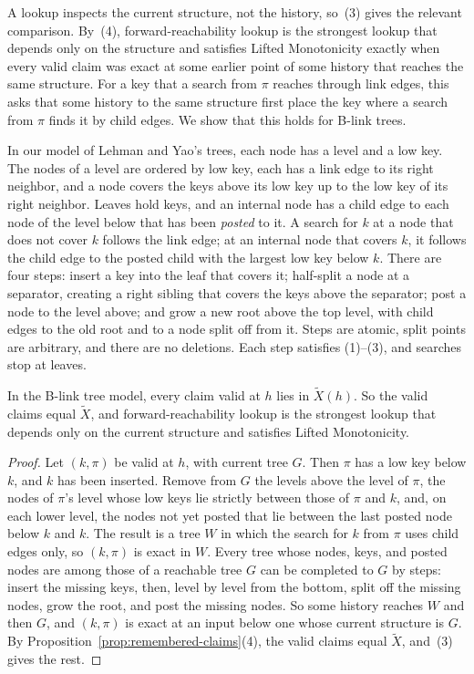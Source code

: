A lookup inspects the current structure, not the history, so~(3) gives the
relevant comparison.  By~(4), forward-reachability lookup is the strongest
lookup that depends only on the structure and satisfies Lifted Monotonicity
exactly when every valid claim was exact at some earlier point of some history
that reaches the same structure.  For a key that a search from $\pi$ reaches
through link edges, this asks that some history to the same structure first
place the key where a search from $\pi$ finds it by child edges.  We show that
this holds for B-link trees.

In our model of Lehman and Yao's trees, each node has a level and a low key.
The nodes of a level are ordered by low key, each has a link edge to its right
neighbor, and a node covers the keys above its low key up to the low key of
its right neighbor.  Leaves hold keys, and an internal node has a child edge to
each node of the level below that has been \emph{posted} to it.  A search for
$k$ at a node that does not cover $k$ follows the link edge; at an internal
node that covers $k$, it follows the child edge to the posted child with the
largest low key below $k$.  There are four steps: insert a key into the leaf
that covers it; half-split a node at a separator, creating a right sibling
that covers the keys above the separator; post a node to the level above; and
grow a new root above the top level, with child edges to the old root and to a
node split off from it.  Steps are atomic, split points are arbitrary, and
there are no deletions.  Each step satisfies (1)--(3), and searches stop at
leaves.

\begin{proposition}
\label{prop:blink}
In the B-link tree model, every claim valid at $h$ lies in
$\widetilde X(h)$.  So the valid claims equal $\widetilde X$, and
forward-reachability lookup is the strongest lookup that depends only on the
current structure and satisfies Lifted Monotonicity.
\end{proposition}

\begin{proof}
Let $(k,\pi)$ be valid at $h$, with current tree $G$.  Then $\pi$ has a low
key below $k$, and $k$ has been inserted.  Remove from $G$ the levels above
the level of $\pi$, the nodes of $\pi$'s level whose low keys lie strictly
between those of $\pi$ and $k$, and, on each lower level, the nodes not yet
posted that lie between the last posted node below $k$ and $k$.  The result is
a tree $W$ in which the search for $k$ from $\pi$ uses child edges only, so
$(k,\pi)$ is exact in $W$.  Every tree whose nodes, keys, and posted nodes are
among those of a reachable tree $G$ can be completed to $G$ by steps: insert
the missing keys, then, level by level from the bottom, split off the missing
nodes, grow the root, and post the missing nodes.  So some history reaches $W$
and then $G$, and $(k,\pi)$ is exact at an input below one whose current
structure is $G$.  By Proposition~\ref{prop:remembered-claims}(4), the valid
claims equal $\widetilde X$, and~(3) gives the rest.
\end{proof}

